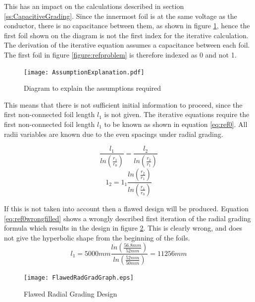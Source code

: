 This has an impact on the calculations described in section \ref{ss:CapacitiveGrading}.
Since the innermost foil is at the same voltage as the conductor, there is no capacitance between them, as shown in figure \ref{figure:required assumptions}, hence the first foil shown on the diagram is not the first index for the iterative calculation.
The derivation of the iterative equation assumes a capacitance between each foil. 
The first foil in figure \ref{figure:refproblem} is therefore indexed as 0 and not 1.

\begin{figure}[!h]
   \centering
   \texttt{[image: AssumptionExplanation.pdf]}
   \caption{Diagram to explain the assumptions required}
   \label{figure:required assumptions}
\end{figure}

This means that there is not sufficient initial information to proceed, since the first non-connected foil length $l_1$ is not given.
The iterative equations require the first non-connected foil length $l_1$ to be known as shown in equation \ref{eq:ref0}. 
All radii variables are known due to the even spacings under radial grading. 

\begin{equation}
   \label{eq:ref0}
   \displaystyle\frac{l_{1}}{ln(\displaystyle\frac{r_{1}}{r_{0}})} = \displaystyle\frac{ l_{2}}{ln(\displaystyle\frac{r_{2}}{r_{1}})} 
\end{equation}
\begin{equation}
   \label{eq:ref0forl1}
   1_{2} = 1_{1}\displaystyle\frac{{ln(\displaystyle\frac{r_{2}}{r_{1}})} }{ln(\displaystyle\frac{r_{1}}{r_{0}})}
\end{equation}



If this is not taken into account then a flawed design will be produced.
Equation \ref{eq:ref0wrongfilled} shows a wrongly described first iteration of the radial grading formula which results in the design in figure \ref{figure:flawedgraph}. This is clearly wrong, and does not give the hyperbolic shape from the beginning of the foils.
\begin{equation}
   \label{eq:ref0wrongfilled}
   l_{1} = 5000mm\displaystyle\frac{{ln(\displaystyle\frac{56.8mm}{52mm})} }{ln(\displaystyle\frac{52mm}{50mm})}
   = 11256mm
\end{equation}

\begin{figure}[!h]
   \centering
   \texttt{[image: FlawedRadGradGraph.eps]}
   \caption{Flawed Radial Grading Design}
   \label{figure:flawedgraph}
\end{figure}

